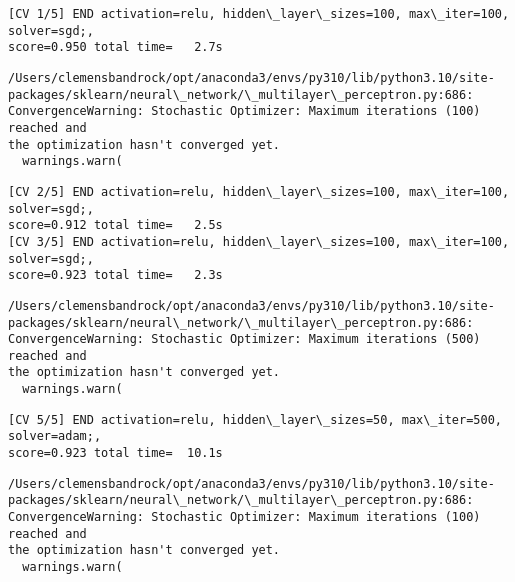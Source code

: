 \documentclass[11pt]{article}
\begin{document}
    \begin{Verbatim}[commandchars=\\\{\}]
[CV 1/5] END activation=relu, hidden\_layer\_sizes=100, max\_iter=100, solver=sgd;,
score=0.950 total time=   2.7s
    \end{Verbatim}

    \begin{Verbatim}[commandchars=\\\{\}]
/Users/clemensbandrock/opt/anaconda3/envs/py310/lib/python3.10/site-
packages/sklearn/neural\_network/\_multilayer\_perceptron.py:686:
ConvergenceWarning: Stochastic Optimizer: Maximum iterations (100) reached and
the optimization hasn't converged yet.
  warnings.warn(
    \end{Verbatim}

    \begin{Verbatim}[commandchars=\\\{\}]
[CV 2/5] END activation=relu, hidden\_layer\_sizes=100, max\_iter=100, solver=sgd;,
score=0.912 total time=   2.5s
[CV 3/5] END activation=relu, hidden\_layer\_sizes=100, max\_iter=100, solver=sgd;,
score=0.923 total time=   2.3s
    \end{Verbatim}

    \begin{Verbatim}[commandchars=\\\{\}]
/Users/clemensbandrock/opt/anaconda3/envs/py310/lib/python3.10/site-
packages/sklearn/neural\_network/\_multilayer\_perceptron.py:686:
ConvergenceWarning: Stochastic Optimizer: Maximum iterations (500) reached and
the optimization hasn't converged yet.
  warnings.warn(
    \end{Verbatim}

    \begin{Verbatim}[commandchars=\\\{\}]
[CV 5/5] END activation=relu, hidden\_layer\_sizes=50, max\_iter=500, solver=adam;,
score=0.923 total time=  10.1s
    \end{Verbatim}

    \begin{Verbatim}[commandchars=\\\{\}]
/Users/clemensbandrock/opt/anaconda3/envs/py310/lib/python3.10/site-
packages/sklearn/neural\_network/\_multilayer\_perceptron.py:686:
ConvergenceWarning: Stochastic Optimizer: Maximum iterations (100) reached and
the optimization hasn't converged yet.
  warnings.warn(
    \end{Verbatim}
\end{document}

